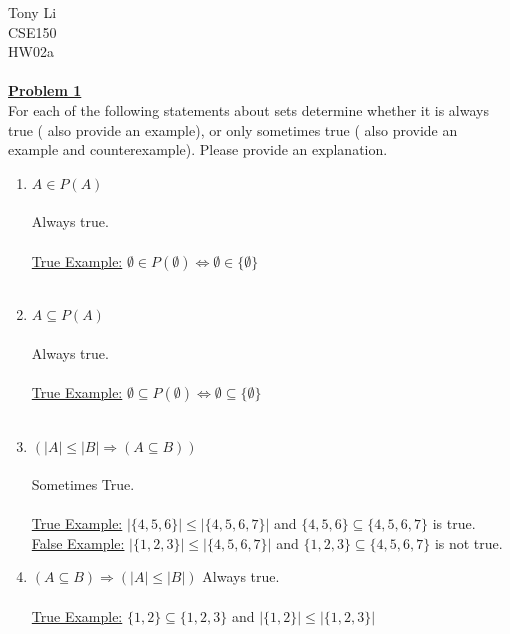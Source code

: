 \documentclass[11pt]{article}
\begin{document}
\noindent 
Tony Li \\
CSE150 \\
HW02a \\\\

	\noindent\textbf{\underline{Problem 1}}\\
	For each of the following statements about sets determine whether it is always true ( also provide 
	an example), or only sometimes true ( also provide an example and counterexample). Please 
	provide an explanation.

	\begin{enumerate}
		\item $A \in P(A)$ \\\\
			Always true. \\\\
				\underline{True Example:} $\emptyset \in P(\emptyset)  \Longleftrightarrow \emptyset \in \{\emptyset\} $ \\\\
				
		\item $A \subseteq P(A)$\\\\
			Always true. \\\\
				\underline{True Example:} $\emptyset \subseteq P(\emptyset)  \Longleftrightarrow \emptyset \subseteq \{\emptyset\} $ \\\\       

		\item $(|A| \leq |B| \Rightarrow (A \subseteq B))$\\\\
			Sometimes True. \\\\
				\underline{True Example:} $|\{4, 5, 6\}| \leq |\{4, 5, 6, 7\}|$ and $\{4, 5, 6\} \subseteq \{4, 5, 6, 7\}$ is true.\\
				\underline{False Example:} $|\{1, 2, 3\}| \leq |\{4, 5, 6, 7\}|$ and $\{1, 2, 3\} \subseteq \{4, 5, 6, 7\}$ is not true.\\
		\item $( A \subseteq B ) \Rightarrow ( |A| \leq |B| )$	
			Always true. \\\\
				\underline{True Example:} $\{1, 2\} \subseteq \{1, 2, 3\}$ and $|\{1, 2\}| \leq |\{1, 2, 3\}|$ 
	\end{enumerate}
\end{document}
